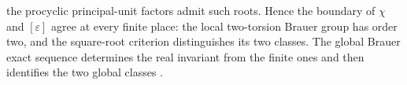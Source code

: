 the procyclic principal-unit factors admit such roots.
Hence the boundary of $\chi$ and $[\varepsilon]$ agree at every finite
place: the local two-torsion Brauer group has order two, and the
square-root criterion distinguishes its two classes. The global
Brauer exact sequence determines the real invariant from the finite
ones and then identifies the two global classes
\cite[I.1.6(b) and proof of II.2.1, p.~164]{milne}.

